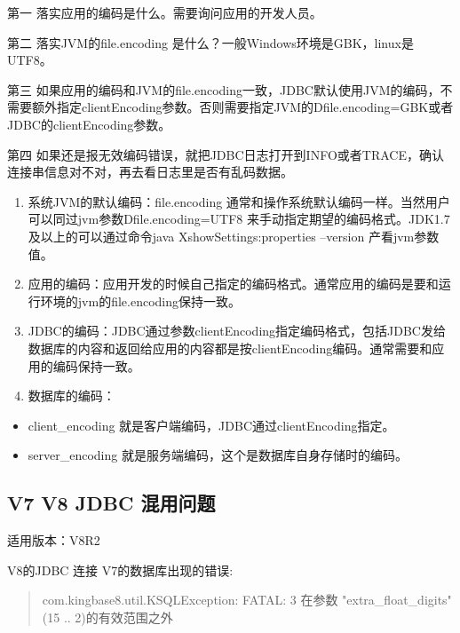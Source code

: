 \documentclass[letterpaper,10pt,english]{sphinxmanual}
\begin{document}


第一 落实应用的编码是什么。需要询问应用的开发人员。

第二 落实JVM的file.encoding 是什么？一般Windows环境是GBK，linux是UTF8。

第三 如果应用的编码和JVM的file.encoding一致，JDBC默认使用JVM的编码，不需要额外指定clientEncoding参数。否则需要指定JVM的\sphinxhyphen{}Dfile.encoding=GBK或者JDBC的clientEncoding参数。

第四 如果还是报无效编码错误，就把JDBC日志打开到INFO或者TRACE，确认连接串信息对不对，再去看日志里是否有乱码数据。

\begin{enumerate}
%
\item {} 
系统JVM的默认编码：file.encoding 通常和操作系统默认编码一样。当然用户可以同过jvm参数\sphinxhyphen{}Dfile.encoding=UTF8 来手动指定期望的编码格式。JDK1.7及以上的可以通过命令java \sphinxhyphen{}XshowSettings:properties –version 产看jvm参数值。

\item {} 
应用的编码：应用开发的时候自己指定的编码格式。通常应用的编码是要和运行环境的jvm的file.encoding保持一致。

\item {} 
JDBC的编码：JDBC通过参数clientEncoding指定编码格式，包括JDBC发给数据库的内容和返回给应用的内容都是按clientEncoding编码。通常需要和应用的编码保持一致。

\item {} 
数据库的编码：

\end{enumerate}
\begin{itemize}
\item {} 
client\_encoding 就是客户端编码，JDBC通过clientEncoding指定。

\item {} 
server\_encoding 就是服务端编码，这个是数据库自身存储时的编码。

\end{itemize}


\subsection{V7 V8 JDBC 混用问题}
\label{\detokenize{interface/jdbc:v7-v8-jdbc}}
适用版本：V8R2

V8的JDBC 连接 V7的数据库出现的错误:
\begin{quote}

com.kingbase8.util.KSQLException: FATAL: 3 在参数 "extra\_float\_digits" (\sphinxhyphen{}15 .. 2)的有效范围之外
\end{quote}
\end{document}
